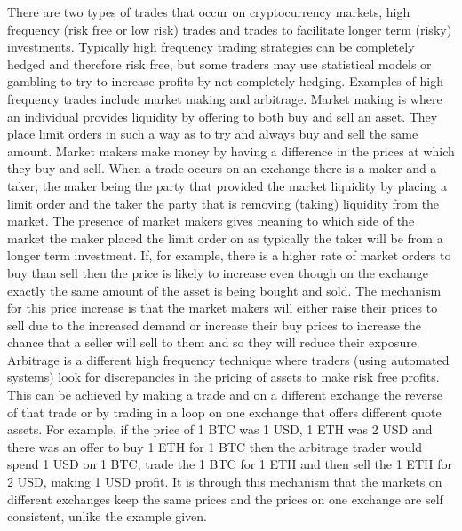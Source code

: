 \documentclass[a4paper,10pt]{article}
\begin{document}
There are two types of trades that occur on cryptocurrency markets, high frequency (risk free or low risk) trades and trades to facilitate longer term (risky) investments. Typically high frequency trading strategies can be completely hedged and therefore risk free, but some traders may use statistical models or gambling to try to increase profits by not completely hedging. Examples of high frequency trades include market making and arbitrage. Market making is where an individual provides liquidity by offering to both buy and sell an asset. They place limit orders in such a way as to try and always buy and sell the same amount. Market makers make money by having a difference in the prices at which they buy and sell\cite{marketmaking}. When a trade occurs on an exchange there is a maker and a taker, the maker being the party that provided the market liquidity by placing a limit order and the taker the party that is removing (taking) liquidity from the market. The presence of market makers gives meaning to which side of the market the maker placed the limit order on as typically the taker will be from a longer term investment. If, for example, there is a higher rate of market orders to buy than sell then the price is likely to increase even though on the exchange exactly the same amount of the asset is being bought and sold. The mechanism for this price increase is that the market makers will either raise their prices to sell due to the increased demand or increase their buy prices to increase the chance that a seller will sell to them and so they will reduce their exposure. Arbitrage is a different high frequency technique where traders (using automated systems) look for discrepancies in the pricing of assets to make risk free profits. This can be achieved by making a trade and on a different exchange the reverse of that trade or by trading in a loop on one exchange that offers different quote assets. For example, if the price of 1 BTC was 1 USD, 1 ETH was 2 USD and there was an offer to buy 1 ETH for 1 BTC then the arbitrage trader would spend 1 USD on 1 BTC, trade the 1 BTC for 1 ETH and then sell the 1 ETH for 2 USD, making 1 USD profit. It is through this mechanism that the markets on different exchanges keep the same prices and the prices on one exchange are self consistent, unlike the example given. \\ \\
\end{document}
